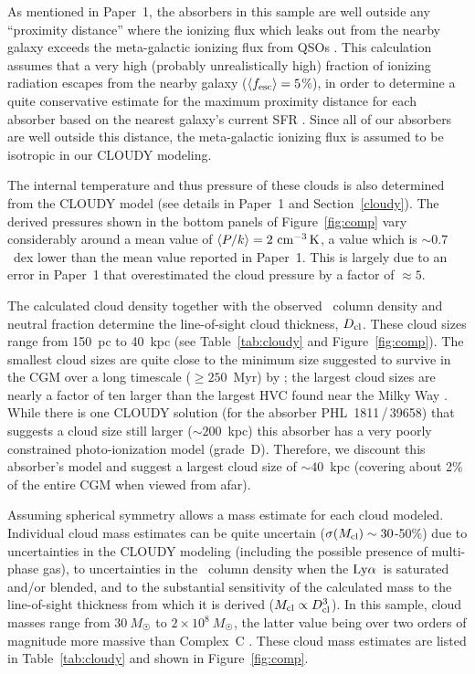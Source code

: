 \documentclass[twocolumn,twocolappendix,tighten,times]{aastex6}
\newcommand{\HI}{\ion{H}{1}}
\newcommand{\lya}{\ensuremath{{\rm Ly}\alpha}}
\begin{document}
As mentioned in Paper~1, the absorbers in this sample are well outside any 
``proximity distance'' where the ionizing flux which leaks out from the nearby 
galaxy exceeds the meta-galactic ionizing flux from QSOs \citep{giroux97}. This 
calculation assumes that a very high (probably unrealistically high) fraction of 
ionizing radiation escapes from the nearby galaxy 
($\langle f_{\rm esc} \rangle = 5$\%), in order to determine a quite conservative 
estimate for the maximum proximity distance for each absorber based on the nearest 
galaxy's current SFR \citep{giroux97}. Since all of our absorbers are well outside 
this distance, the meta-galactic ionizing flux is assumed to be isotropic in our 
CLOUDY modeling. 

The internal temperature and thus pressure of these clouds is also determined from 
the CLOUDY model (see details in Paper~1 and Section~\ref{cloudy}). The derived 
pressures shown in the bottom panels of Figure~\ref{fig:comp} vary considerably 
around a mean value of $\langle P/k \rangle = 2~{\rm cm^{-3}\,K}$, a value which 
is $\sim0.7$~dex lower than the mean value reported in Paper~1. This is largely 
due to an error in Paper~1 that overestimated the cloud pressure by a factor of 
$\approx5$. 

The calculated cloud density together with the observed \HI\ column 
density and neutral fraction determine the line-of-sight cloud thickness, 
$D_{\rm cl}$. These cloud sizes range from 150~pc to 40~kpc (see 
Table~\ref{tab:cloudy} and Figure~\ref{fig:comp}). The smallest cloud sizes 
are quite close to the minimum size suggested to survive in the CGM over a long 
timescale ($\geq250$~Myr) by \citet{armillotta16}; the largest cloud sizes are 
nearly a factor of ten larger than the largest HVC found near the Milky Way 
\citep[Complex~C;][]{wakker07}. While there is one CLOUDY solution (for the 
absorber PHL~1811\,/\,39658) that suggests a cloud size still larger 
($\sim200$~kpc) this absorber has a very poorly constrained photo-ionization 
model (grade~D). Therefore, we discount this absorber's model and 
suggest a largest cloud size of $\sim40$~kpc (covering about 2\% of the entire CGM 
when viewed from afar). 

Assuming spherical symmetry allows a mass estimate for each cloud modeled. 
Individual cloud mass estimates can be quite uncertain 
($\sigma(M_{\rm cl}) \sim 30$-50\%) due to uncertainties in the 
CLOUDY modeling (including the possible presence of multi-phase gas), to 
uncertainties in the \HI\ column density when the \lya\ is saturated and/or 
blended, and to the substantial sensitivity of the calculated mass to the 
line-of-sight thickness from which it is derived 
($M_{\rm cl} \propto D_{\rm cl}^3$). In this sample, cloud masses range from 
$30~M_{\Sun}$ to $2\times10^8~M_{\Sun}$, the latter value being over two orders 
of magnitude more massive than Complex~C \citep{wakker07}. These cloud mass 
estimates are listed in Table~\ref{tab:cloudy} and shown in Figure~\ref{fig:comp}.
\end{document}
